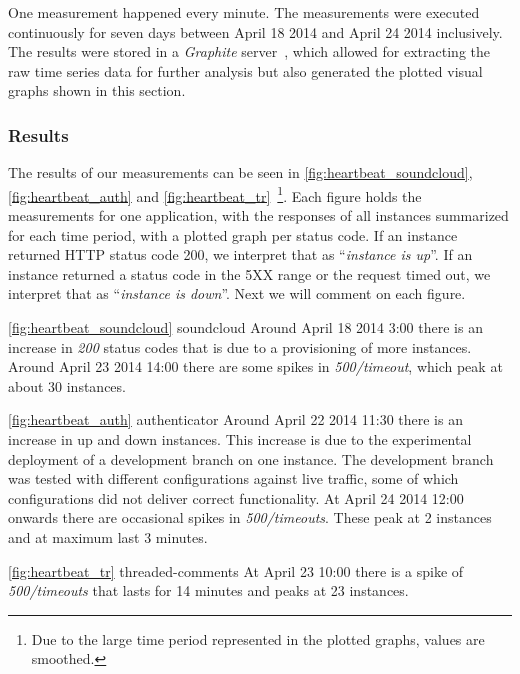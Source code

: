 One measurement happened every minute. The measurements were executed continuously for seven days between April 18 2014 and April 24 2014 inclusively. The results were stored in a \emph{Graphite} server~\cite{graphite}, which allowed for extracting the raw time series data for further analysis but also generated the plotted visual graphs shown in this section.

\subsubsection{Results}

The results of our measurements can be seen in \autoref{fig:heartbeat_soundcloud}, \autoref{fig:heartbeat_auth} and \autoref{fig:heartbeat_tr}~\footnote{Due to the large time period represented in the plotted graphs, values are smoothed.}. Each figure holds the measurements for one application, with the responses of all instances summarized for each time period, with a plotted graph per status code. If an instance returned HTTP status code 200, we interpret that as ``\emph{instance is up}''. If an instance returned a status code in the 5XX range or the request timed out, we interpret that as ``\emph{instance is down}''. Next we will comment on each figure.

\begin{tdescription}
  \item[\autoref{fig:heartbeat_soundcloud} soundcloud] Around April 18 2014 3:00 there is an increase in \emph{200} status codes that is due to a provisioning of more instances. Around April 23 2014 14:00 there are some spikes in \emph{500/timeout}, which peak at about 30 instances.
  \item[\autoref{fig:heartbeat_auth} authenticator] Around April 22 2014 11:30 there is an increase in up and down instances. This increase is due to the experimental deployment of a development branch on one instance. The development branch was tested with different configurations against live traffic, some of which configurations did not deliver correct functionality. At April 24 2014 12:00 onwards there are occasional spikes in \emph{500/timeouts}. These peak at 2 instances and at maximum last 3 minutes.
  \item[\autoref{fig:heartbeat_tr} threaded-comments] At April 23 10:00 there is a spike of \emph{500/timeouts} that lasts for 14 minutes and peaks at 23 instances.
\end{tdescription}

